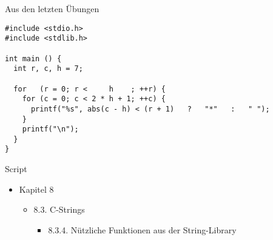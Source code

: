 
\begin{frame}[fragile]{Aus den letzten Übungen}
%
\begin{codebox}
\begin{verbatim}
#include <stdio.h>
#include <stdlib.h>

int main () {
  int r, c, h = 7;
  
  for   (r = 0; r <     h    ; ++r) {
    for (c = 0; c < 2 * h + 1; ++c) {
      printf("%s", abs(c - h) < (r + 1)   ?   "*"   :   " ");
    }
    printf("\n");
  }
}
\end{verbatim}
\end{codebox}
%
\end{frame}


\begin{frame}{Script}
%
\begin{itemize}
\item Kapitel 8
	\begin{itemize}
	\item 8.3. C-Strings
		\begin{itemize}
		\item 8.3.4. Nützliche Funktionen aus der String-Library
		\end{itemize}
	\end{itemize}
\end{itemize}
%
\end{frame}


